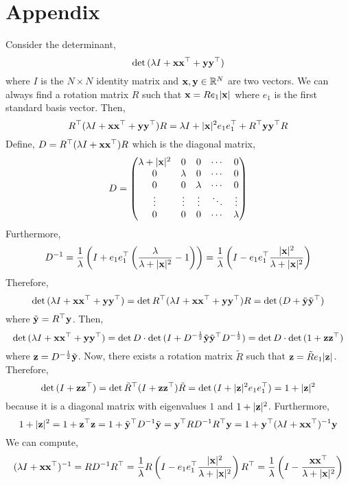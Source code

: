 \documentclass[12pt]{article}
\begin{document}
\section{Appendix}

Consider the determinant,
\[ \det{(\lambda I + \bf{x} \bf{x}^\top + \bf{y} \bf{y}^\top)} \]
where $I$ is the $N \times N$ identity matrix and $\bf{x}, \bf{y} \in \R^N$ are two vectors.
We can always find a rotation matrix $R$ such that $\bf{x} = R e_1 |\bf{x}|$ where $e_1$ is the first standard  basis vector. Then,
\[ R^{\top} (\lambda I + \bf{x} \bf{x}^\top + \bf{y} \bf{y}^\top) R = \lambda I + |\bf{x}|^2 e_1 e_1^\top + R^{\top} \bf{y} \bf{y}^{\top} R \]
Define, $D = R^{\top} (\lambda I + \bf{x} \bf{x}^\top)R$ which is the diagonal matrix,
\[ D = 
\begin{pmatrix}
\lambda + |\bf{x}|^2 & 0 & 0 & \cdots & 0
\\
0 & \lambda & 0 & \cdots & 0
\\
0 & 0 & \lambda & \cdots & 0
\\
\vdots & \vdots & \vdots & \ddots & \vdots
\\
0 & 0 & 0 & \cdots & \lambda 
\end{pmatrix}\]
Furthermore, 
\[ D^{-1} = \frac{1}{\lambda} \left( I + e_1 e_1^{\top} \left( \frac{\lambda}{\lambda + |\bf{x}|^2} - 1 \right) \right) = \frac{1}{\lambda}  \left( I - e_1 e_1^\top \frac{|\bf{x}|^2}{\lambda + |\bf{x}|^2} \right) \]
Therefore,
\[ \det{(\lambda I + \bf{x} \bf{x}^\top + \bf{y} \bf{y}^\top)} = \det{R^{\top} (\lambda I + \bf{x} \bf{x}^\top + \bf{y} \bf{y}^\top) R} = \det{(D + \tilde{\bf{y}} \tilde{\bf{y}}^\top)} \]
where $\tilde{\bf{y}} = R^{\top} \bf{y}$. Then,
\[  \det{(\lambda I + \bf{x} \bf{x}^\top + \bf{y} \bf{y}^\top)} = \det{D} \cdot \det{(I + D^{-\frac{1}{2}} \tilde{\bf{y}} \tilde{\bf{y}}^\top D^{- \frac{1}{2}})} = \det{D} \cdot \det{(1 + \bf{z} \bf{z}^{\top})} \]
where $\bf{z} = D^{-\frac{1}{2}} \tilde{\bf{y}}$. Now, there exists a rotation matrix $\tilde{R}$ such that $\bf{z} = \tilde{R} e_1 |\bf{z}|$. 
Therefore,
\[ \det{(I + \bf{z} \bf{z}^\top)} = \det{\tilde{R}^{\top} (I + \bf{z} \bf{z}^\top) \tilde{R}} = \det{(I + |\bf{z}|^2 e_1 e_1^{\top})} = 1 + |\bf{z}|^2 \]
because it is a diagonal matrix with eigenvalues $1$ and $1 + |\bf{z}|^2$. Furthermore,
\[ 1 + |\bf{z}|^2 = 1 + \bf{z}^\top \bf{z} = 1 + \tilde{\bf{y}}^\top D^{-1} \tilde{\bf{y}} = \bf{y}^\top R D^{-1} R^{\top} \bf{y} = 1 + \bf{y}^\top (\lambda I + \bf{x} \bf{x}^\top )^{-1} \bf{y} \]
We can compute,
\[ (\lambda I + \bf{x} \bf{x}^\top )^{-1} = R D^{-1} R^{\top} = \frac{1}{\lambda} R \left( I - e_1 e_1^\top \frac{|\bf{x}|^2}{\lambda + |\bf{x}|^2} \right) R^{\top} 
= \frac{1}{\lambda} \left( I - \frac{\bf{x} \bf{x}^\top}{\lambda + |\bf{x}|^2} \right) \]
\end{document}

